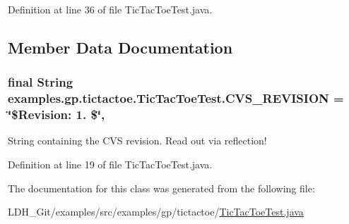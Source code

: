 Definition at line 36 of file Tic\-Tac\-Toe\-Test.\-java.



\subsection{Member Data Documentation}
\hypertarget{classexamples_1_1gp_1_1tictactoe_1_1_tic_tac_toe_test_ada31f812f8da261dfb789d2e4695596a}{
\subsubsection[{C\-V\-S\-\_\-\-R\-E\-V\-I\-S\-I\-O\-N}]{\setlength{\rightskip}{0pt plus 5cm}final String examples.\-gp.\-tictactoe.\-Tic\-Tac\-Toe\-Test.\-C\-V\-S\-\_\-\-R\-E\-V\-I\-S\-I\-O\-N = \char`\"{}\$Revision\-: 1. \$\char`\"{}\hspace{0.3cm}{\ttfamily [static]}, {\ttfamily [private]}}}\label{classexamples_1_1gp_1_1tictactoe_1_1_tic_tac_toe_test_ada31f812f8da261dfb789d2e4695596a}
String containing the C\-V\-S revision. Read out via reflection! 

Definition at line 19 of file Tic\-Tac\-Toe\-Test.\-java.



The documentation for this class was generated from the following file\-:\begin{DoxyCompactItemize}
\item 
L\-D\-H\-\_\-\-Git/examples/src/examples/gp/tictactoe/\hyperlink{_tic_tac_toe_test_8java}{Tic\-Tac\-Toe\-Test.\-java}\end{DoxyCompactItemize}
